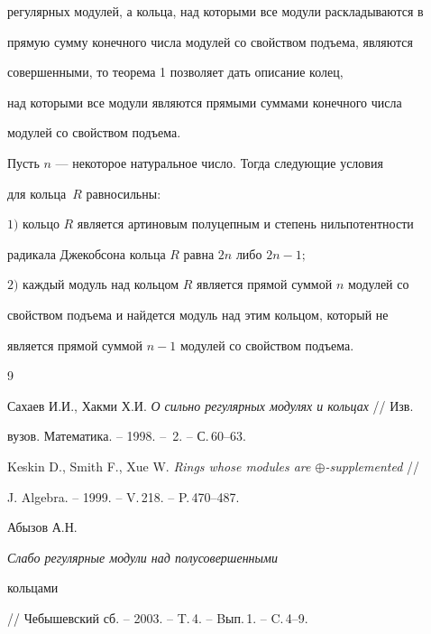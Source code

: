 регулярных модулей, а кольца, над которыми все модули раскладываются в 


прямую сумму конечного числа модулей со свойством подъема, являются 


совершенными, то теорема 1 позволяет дать описание колец, 


над которыми все модули являются прямыми суммами конечного числа 


модулей со свойством подъема.





\begin{thm}


Пусть $n$ --- некоторое натуральное число. Тогда следующие условия 


для кольца~$R$ равносильны\/${:}$  





$1)$ кольцо $R$  является артиновым полуцепным и степень нильпотентности


радикала Джекобсона кольца $R$  равна $2n$ либо $2n-1;$  


$2)$ каждый модуль над кольцом $R$ является прямой суммой $n$ модулей со 


свойством подъема и найдется модуль над этим кольцом, который не 


является прямой суммой  $n-1$ модулей со свойством подъема. 


\end{thm}








\begin{thebibliography}{9}







Сахаев И.И., Хакми Х.И. {\em О сильно регулярных модулях и кольцах} // Изв. 


вузов. Математика. -- 1998. -- \No\,2. -- С.\,60--63.    




Keskin D., Smith F., Xue W. {\em Rings whose modules are $\oplus$-supplemented} // 


J. Algebra. -- 1999. -- V.\,218. -- P.\,470--487.




Абызов А.Н. {\em Слабо регулярные модули над полусовершенными 


кольцами} // Чебышевский сб. -- 2003. -- T.\,4. -- Bып.\,1. -- C.\,4--9.





\end{thebibliography}





\vskip 0.2cm












\label{end}





